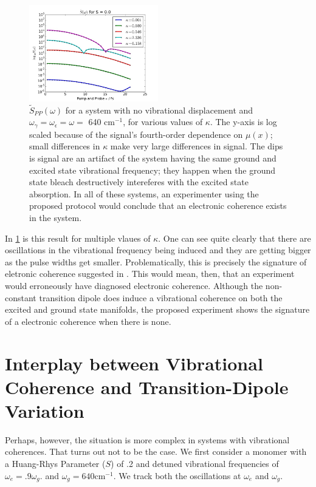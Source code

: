 \begin{figure}
   \includegraphics[width=0.5\textwidth]{images/s_omega_omegaSame_S0.jpeg}
   \caption{$\tilde{S}_{PP} ( \omega)$ for a system with no vibrational displacement and $\omega_{\gamma} = \omega_{\epsilon} = \omega = $ 640 cm$^{-1}$, for various values of $\kappa$.  The y-axis is log scaled because of the signal's fourth-order dependence on $\mu(x)$; small differences in $\kappa$ make very large differences in signal.  The dips is signal are an artifact of the system having the same ground and excited state vibrational frequency; they happen when the ground state bleach destructively intereferes with the excited state absorption.  In all of these systems, an experimenter using the proposed protocol would conclude that an electronic coherence exists in the system.}
	\label{fig:tunedZero}
\end{figure}

In \ref{fig:tunedZero} is this result for multiple vlaues of $\kappa$.  One can see quite clearly that there are oscillations in the vibrational frequency being induced and they are getting bigger as the pulse widths get smaller.  Problematically, this is precisely the signature of eletronic coherence suggested in \cite{allanWitness}.  This would mean, then, that an experiment would erroneously have diagnosed electronic coherence.  Although the non-constant transition dipole does induce a vibrational coherence on both the excited and ground state manifolds, the proposed experiment shows the signature of a electronic coherence when there is none.


\section{Interplay between Vibrational Coherence and Transition-Dipole Variation}
Perhaps, however, the situation is more complex in systems with vibrational coherences. That turns out not to be the case.  We first consider a monomer with a Huang-Rhys Parameter ($S$) of .2 and detuned vibrational frequencies of $\omega_e = .9 \omega_g$. and $\omega_g = 640 \text{cm}^{-1}$.  We  track both  the oscillations at $\omega_e$ and $\omega_g$.

